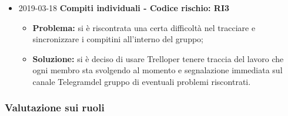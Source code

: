 \begin{itemize}
		\item 2019-03-18 \textbf{Compiti individuali - Codice rischio: RI3} \\
		\begin{itemize}
			\item \textbf{Problema:} si è riscontrata una certa difficoltà nel tracciare e sincronizzare i compitini all'interno del gruppo;
			\item \textbf{Soluzione:} si è deciso di usare Trello\glosp per tenere traccia del lavoro che ogni membro sta svolgendo al momento e segnalazione immediata sul canale Telegram\glosp del gruppo di eventuali problemi riscontrati.
		\end{itemize}
		 		
\end{itemize}

\subsubsection{Valutazione sui ruoli}
